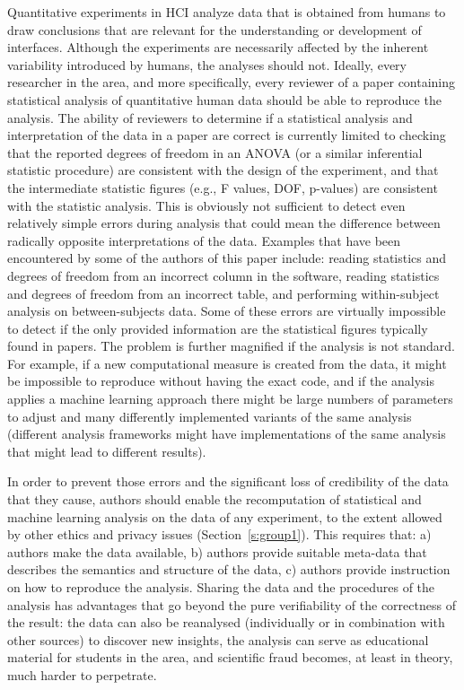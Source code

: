 Quantitative experiments in HCI analyze data that is obtained from humans to draw conclusions that are relevant for the understanding or development of interfaces. Although the experiments are necessarily affected by the inherent variability introduced by humans, the analyses should not. Ideally, every researcher in the area, and more specifically, every reviewer of a paper containing statistical analysis of quantitative human data should be able to reproduce the analysis. The ability of reviewers to determine if a statistical analysis and interpretation of the data in a paper are correct is currently limited to checking that the reported degrees of freedom in an ANOVA (or a similar inferential statistic procedure) are consistent with the design of the experiment, and that the intermediate statistic figures (e.g., F values, DOF, p-values) are consistent with the statistic analysis. This is obviously not sufficient to detect even relatively simple errors during analysis that could mean the difference between radically opposite interpretations of the data. Examples that have been encountered by some of the authors of this paper include: reading statistics and degrees of freedom from an incorrect column in the software, reading statistics and degrees of freedom from an incorrect table, and performing within-subject analysis on between-subjects data. Some of these errors are virtually impossible to detect if the only provided information are the statistical figures typically found in papers. The problem is further magnified if the analysis is not standard. For example, if a new computational measure is created from the data, it might be impossible to reproduce without having the exact code, and if the analysis applies a machine learning approach there might be large numbers of parameters to adjust and many differently implemented variants of the same analysis (different analysis frameworks might have implementations of the same analysis that might lead to different results).

In order to prevent those errors and the significant loss of credibility of the data that they cause, authors should enable the recomputation of statistical and machine learning analysis on the data of any experiment, to the extent allowed by other ethics and privacy issues (Section~\ref{s:group1}). This requires that: a) authors make the data available, b) authors provide suitable meta-data that describes the semantics and structure of the data, c) authors provide instruction on how to reproduce the analysis. Sharing the data and the procedures of the analysis has advantages that go beyond the pure verifiability of the correctness of the result: the data can also be reanalysed (individually or in combination with other sources) to discover new insights, the analysis can serve as educational material for students in the area, and scientific fraud becomes, at least in theory, much harder to perpetrate. 

